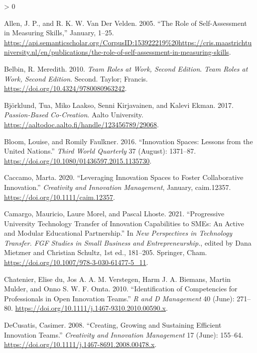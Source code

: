 \documentclass[AMA,STIX1COL,APA,STIX2COL]{WileyNJD-v2}
\newlength{\cslhangindent}
\newenvironment{CSLReferences}[2] %
 {%
  \setlength{\parindent}{0pt}
  \ifodd #1 \everypar{\setlength{\hangindent}{\cslhangindent}}\ignorespaces\fi
  \ifnum #2 > 0
  \setlength{\parskip}{#2\baselineskip}
  \fi
 }%
 {}
\begin{document}
\hypertarget{refs}{}
\begin{CSLReferences}{1}{0}
\leavevmode\hypertarget{ref-Allen2005}{}%
Allen, J. P., and R. K. W. Van Der Velden. 2005. {``The Role of
Self-Assessment in Measuring Skills,''} January, 1--25.
\url{https://api.semanticscholar.org/CorpusID:153922219\%20https://cris.maastrichtuniversity.nl/en/publications/the-role-of-self-assessment-in-measuring-skills}.

\leavevmode\hypertarget{ref-Belbin2010}{}%
Belbin, R. Meredith. 2010. \emph{Team Roles at Work, Second Edition}.
\emph{Team Roles at Work, Second Edition}. Second. Taylor; Francis.
\url{https://doi.org/10.4324/9780080963242}.

\leavevmode\hypertarget{ref-Bjorklund2017}{}%
Björklund, Tua, Miko Laakso, Senni Kirjavainen, and Kalevi Ekman. 2017.
\emph{Passion-Based Co-Creation}. Aalto University.
\url{https://aaltodoc.aalto.fi/handle/123456789/29068}.

\leavevmode\hypertarget{ref-Bloom2016}{}%
Bloom, Louise, and Romily Faulkner. 2016. {``Innovation Spaces: Lessons
from the United Nations.''} \emph{Third World Quarterly} 37 (August):
1371--87. \url{https://doi.org/10.1080/01436597.2015.1135730}.

\leavevmode\hypertarget{ref-Caccamo2020}{}%
Caccamo, Marta. 2020. {``Leveraging Innovation Spaces to Foster
Collaborative Innovation.''} \emph{Creativity and Innovation
Management}, January, caim.12357.
\url{https://doi.org/10.1111/caim.12357}.

\leavevmode\hypertarget{ref-Camargo2021}{}%
Camargo, Mauricio, Laure Morel, and Pascal Lhoste. 2021. {``Progressive
University Technology Transfer of Innovation Capabilities to SMEs: An
Active and Modular Educational Partnership.''} In \emph{New Perspectives
in Technology Transfer. FGF Studies in Small Business and
Entrepreneurship.}, edited by Dana Mietzner and Christian Schultz, 1st
ed., 181--205. Springer, Cham.
\url{https://doi.org/10.1007/978-3-030-61477-5_11}.

\leavevmode\hypertarget{ref-Chatenier2010}{}%
Chatenier, Elise du, Jos A. A. M. Verstegen, Harm J. A. Biemans, Martin
Mulder, and Onno S. W. F. Omta. 2010. {``Identification of Competencies
for Professionals in Open Innovation Teams.''} \emph{R and D Management}
40 (June): 271--80.
\url{https://doi.org/10.1111/j.1467-9310.2010.00590.x}.

\leavevmode\hypertarget{ref-DeCusatis2008}{}%
DeCusatis, Casimer. 2008. {``Creating, Growing and Sustaining Efficient
Innovation Teams.''} \emph{Creativity and Innovation Management} 17
(June): 155--64. \url{https://doi.org/10.1111/j.1467-8691.2008.00478.x}.


\end{CSLReferences}
\end{document}
